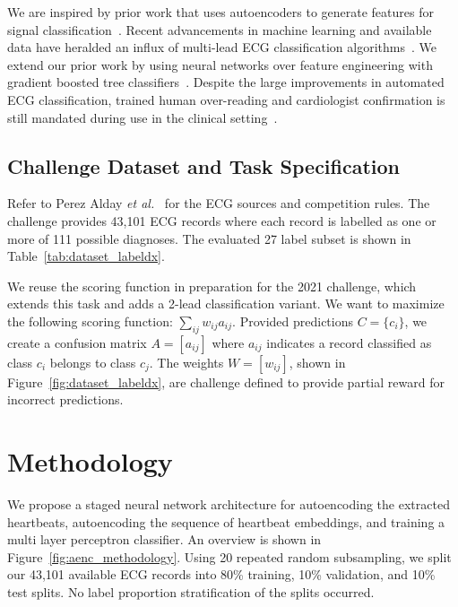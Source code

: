 \documentclass[\main/thesis.tex]{subfiles}
\begin{document}
We are inspired by prior work that uses autoencoders to generate features for signal classification~\cite{8688435,7752836}.
Recent advancements in machine learning and available data have heralded an influx of multi-lead ECG classification algorithms~\cite{ribeiro2020,CHEN2020100886,9206538,BALOGLU201923,8846016,wong2020CINC-multilabel-ECG}.
We extend our prior work by using neural networks over feature engineering with gradient boosted tree classifiers~\cite{wong2020CINC-multilabel-ECG}.
Despite the large improvements in automated ECG classification, trained human over-reading and cardiologist confirmation is still mandated during use in the clinical setting~\cite{SMITH201988,MADIAS2018413}.

\subsection{Challenge Dataset and Task Specification}
Refer to Perez Alday \emph{et al.}~\cite{physionet_challenge_2020} for the ECG sources and competition rules.
The challenge provides 43,101 ECG records where each record is labelled as one or more of 111 possible diagnoses.
The evaluated 27 label subset is shown in Table~\ref{tab:dataset_labeldx}.

We reuse the scoring function in preparation for the 2021 challenge, which extends this task and adds a 2-lead classification variant.
We want to maximize the following scoring function: $\sum_{ij} w_{ij} a_{ij}$.
Provided predictions $C = \{c_i\}$, we create a confusion matrix $A = [a_{ij}]$ where $a_{ij}$ indicates a record classified as class $c_i$ belongs to class $c_j$.
The weights $W = [w_{ij}]$, shown in Figure~\ref{fig:dataset_labeldx}, are challenge defined to provide partial reward for incorrect predictions.

\section{Methodology}

We propose a staged neural network architecture for autoencoding the extracted heartbeats, autoencoding the sequence of heartbeat embeddings, and training a multi layer perceptron classifier.
An overview is shown in Figure~\ref{fig:aenc_methodology}.
Using 20 repeated random subsampling, we split our 43,101 available ECG records into 80\% training, 10\% validation, and 10\% test splits.
No label proportion stratification of the splits occurred.
\end{document}
